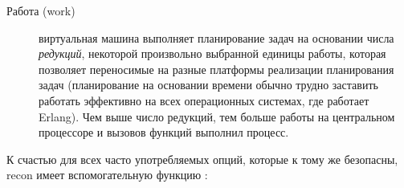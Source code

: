 \begin{description*}
\item[Работа (work)] \hfill
	\begin{description}
	\item[] виртуальная машина выполняет планирование задач на основании числа \emph{редукций}, некоторой произвольно выбранной единицы работы, которая позволяет переносимые на разные платформы реализации планирования задач (планирование на основании времени обычно трудно заставить работать эффективно на всех операционных системах, где работает Erlang). Чем выше число редукций, тем больше работы на центральном процессоре и вызовов функций выполнил процесс.
	\end{description}
\end{description*}

К счастью для всех часто употребляемых опций, которые к тому же безопасны, recon имеет вспомогательную функцию :


